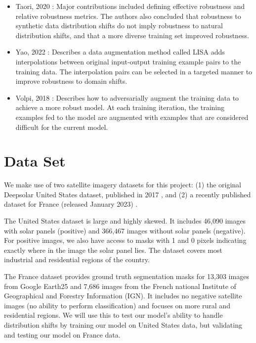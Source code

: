 \documentclass[10pt,twocolumn,letterpaper]{article}
\begin{document}
\begin{itemize}
    \item Taori, 2020 \cite{Taori2020}: Major contributions included defining effective robustness and relative robustness metrics. The authors also concluded that robustness to synthetic data distribution shifts do not imply robustness to natural distribution shifts, and that a more diverse training set improved robustness.
    \item Yao, 2022 \cite{yao2022improving}: Describes a data augmentation method called LISA adds interpolations between original input-output training example pairs to the training data. The interpolation pairs can be selected in a targeted manner to improve robustness to domain shifts.
    \item Volpi, 2018 \cite{volpi2018generalizing}: Describes how to adversarially augment the training data to achieve a more robust model. At each training iteration, the training examples fed to the model are augmented with examples that are considered difficult for the current model.
\end{itemize}

\section{Data Set}

We make use of two satellite imagery datasets for this project: (1) the original Deepsolar United States dataset, published in 2017 \cite{DeepSolar1}, and (2) a recently published dataset for France (released January 2023) \cite{Kasmi2023}.  

The United States dataset is large and highly skewed. It includes 46,090 images with solar panels (positive) and 366,467 images without solar panels (negative). For positive images, we also have access to masks with 1 and 0 pixels indicating exactly where in the image the solar panel lies. The dataset covers most industrial and residential regions of the country.\cite{DeepSolar1} 

 The France dataset provides ground truth segmentation masks for 13,303 images from Google Earth25 and 7,686 images from the French national Institute of Geographical and Forestry Information (IGN). It includes no negative satellite images (no ability to perform classification) and focuses on more rural and residential regions. \cite{Kasmi2023} We will use this to test our model's ability to handle distribution shifts by training our model on United States data, but validating and testing our model on France data. \\
\end{document}

